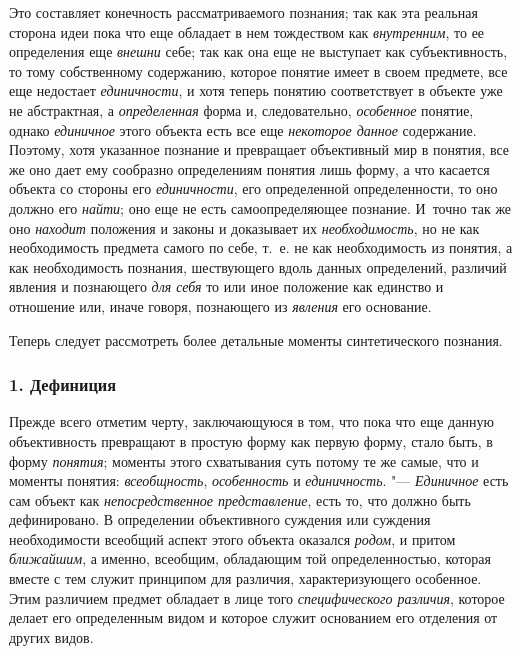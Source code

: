 {{Это составляет конечность рассматриваемого познания; так как
эта реальная сторона идеи пока что еще обладает в нем тождеством как
{\em внутренним}, то ее
определения еще {\em внешни}
себе; так как она еще не выступает как субъективность, то
тому собственному содержанию, которое понятие имеет в своем предмете, все
еще недостает {\em единичности},
и хотя теперь понятию соответствует в объекте уже не
абстрактная, а {\em определенная}
форма и, следовательно,
{\em особенное} понятие,
однако {\em единичное}
этого объекта есть все еще
{\em некоторое данное}
содержание. Поэтому, хотя указанное познание и превращает
объективный мир в понятия, все же оно дает ему сообразно
определениям понятия лишь форму, а что касается объекта со стороны его
{\em единичности}, его
определенной определенности, то оно должно его
{\em найти}; оно еще не
есть самоопределяющее познание. И~точно так же оно
{\em находит} положения и
законы и доказывает их
{\em необходимость}, но
не как необходимость предмета самого по себе, т.~е. не как необходимость из
понятия, а как необходимость познания, шествующего вдоль данных
определений, различий явления и познающего
{\em для себя} то или
иное положение как единство и отношение или, иначе говоря, познающего из
{\em явления} его
основание.

Теперь следует рассмотреть более детальные моменты
синтетического познания.
\subsubsection[1. Дефиниция]{\bfseries 1. Дефиниция}

Прежде всего отметим черту, заключающуюся в том, что пока что
еще данную объективность превращают в простую форму как первую форму, стало
быть, в форму {\em понятия};
моменты этого схватывания суть потому те же самые, что и
моменты понятия: {\em всеобщность},
{\em особенность} и
{\em единичность}. "---
{\em Единичное} есть сам
объект как {\em непосредственное
представление}, есть то, что должно быть дефинировано. В
определении объективного суждения или суждения необходимости всеобщий
аспект этого объекта оказался
{\em родом}, и притом
{\em ближайшим}, а
именно, всеобщим, обладающим той определенностью, которая вместе с тем
служит принципом для различия, характеризующего особенное. Этим различием
предмет обладает в лице того
{\em специфического различия},
которое делает его определенным видом и которое служит
основанием его отделения от других видов.

}}
